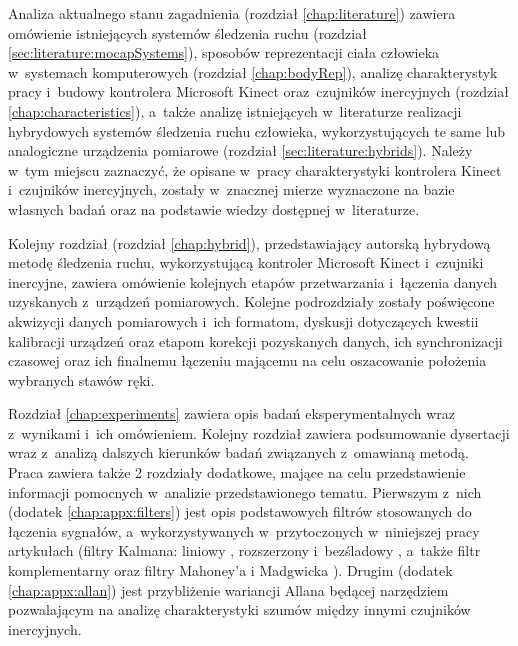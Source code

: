 Analiza aktualnego stanu zagadnienia (rozdział \ref{chap:literature}) zawiera omówienie istniejących systemów śledzenia ruchu (rozdział \ref{sec:literature:mocapSystems}), sposobów reprezentacji ciała człowieka w~systemach komputerowych (rozdział \ref{chap:bodyRep}), analizę charakterystyk pracy i~budowy kontrolera Microsoft Kinect oraz~czujników inercyjnych (rozdział \ref{chap:characteristics}), a~także analizę istniejących w~literaturze realizacji hybrydowych systemów śledzenia ruchu człowieka, wykorzystujących te same lub analogiczne urządzenia pomiarowe (rozdział \ref{sec:literature:hybrids}). Należy w~tym miejscu zaznaczyć, że opisane w~pracy charakterystyki kontrolera Kinect i~czujników inercyjnych, zostały w~znacznej mierze wyznaczone na bazie własnych badań oraz na podstawie wiedzy dostępnej w~literaturze.

Kolejny rozdział (rozdział \ref{chap:hybrid}), przedstawiający autorską hybrydową metodę śledzenia ruchu, wykorzystującą kontroler Microsoft Kinect i~czujniki inercyjne, zawiera omówienie kolejnych etapów przetwarzania i~łączenia danych uzyskanych z~urządzeń pomiarowych. Kolejne podrozdziały zostały poświęcone akwizycji danych pomiarowych i~ich formatom, dyskusji dotyczących kwestii kalibracji urządzeń oraz etapom korekcji pozyskanych danych, ich synchronizacji czasowej oraz ich finalnemu łączeniu mającemu na celu oszacowanie położenia wybranych stawów ręki. 

Rozdział \ref{chap:experiments} zawiera opis badań eksperymentalnych wraz z~wynikami i~ich omówieniem. Kolejny rozdział zawiera podsumowanie dysertacji wraz z~analizą dalszych kierunków badań związanych z~omawianą metodą.\\

Praca zawiera także 2 rozdziały dodatkowe, mające na celu przedstawienie informacji pomocnych w~analizie przedstawionego tematu. Pierwszym z~nich (dodatek \ref{chap:appx:filters}) jest opis podstawowych filtrów stosowanych do łączenia sygnałów, a~wykorzystywanych w~przytoczonych w~niniejszej pracy artykułach (filtry Kalmana: liniowy \cite{Kalman1960}, rozszerzony \cite{smith1962application} i~bezśladowy \cite{Julier1995}, a~także filtr komplementarny \cite{Euston2008} oraz filtry Mahoney'a \cite{Baldwin2007} i Madgwicka \cite{Madgwick2010}). Drugim (dodatek \ref{chap:appx:allan}) jest przybliżenie wariancji Allana \cite{Allan1966}  będącej narzędziem pozwalającym na analizę charakterystyki szumów między innymi czujników inercyjnych.
